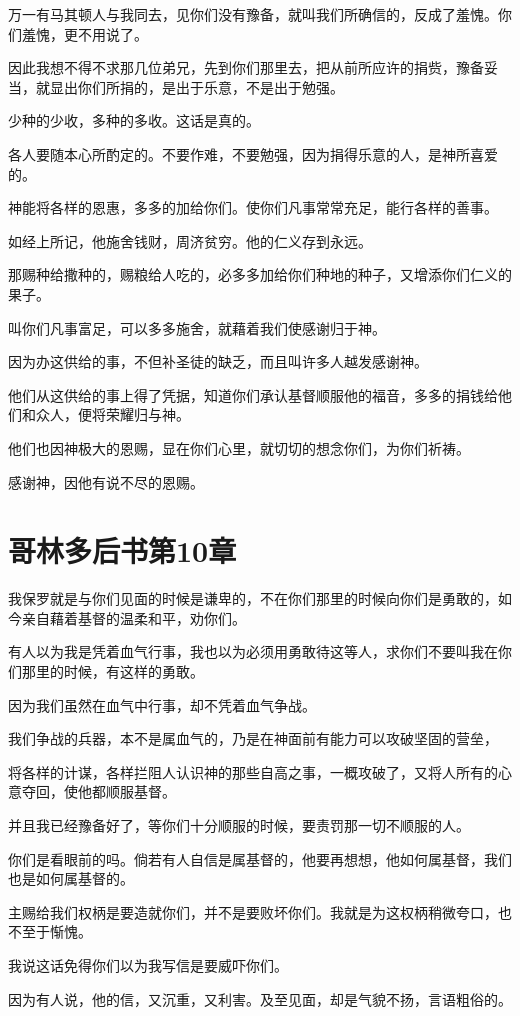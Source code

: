 \documentclass[12pt,oneside]{book}
\begin{document}
万一有马其顿人与我同去，见你们没有豫备，就叫我们所确信的，反成了羞愧。你们羞愧，更不用说了。

因此我想不得不求那几位弟兄，先到你们那里去，把从前所应许的捐赀，豫备妥当，就显出你们所捐的，是出于乐意，不是出于勉强。

少种的少收，多种的多收。这话是真的。

各人要随本心所酌定的。不要作难，不要勉强，因为捐得乐意的人，是神所喜爱的。

神能将各样的恩惠，多多的加给你们。使你们凡事常常充足，能行各样的善事。

如经上所记，他施舍钱财，周济贫穷。他的仁义存到永远。

那赐种给撒种的，赐粮给人吃的，必多多加给你们种地的种子，又增添你们仁义的果子。

叫你们凡事富足，可以多多施舍，就藉着我们使感谢归于神。

因为办这供给的事，不但补圣徒的缺乏，而且叫许多人越发感谢神。

他们从这供给的事上得了凭据，知道你们承认基督顺服他的福音，多多的捐钱给他们和众人，便将荣耀归与神。

他们也因神极大的恩赐，显在你们心里，就切切的想念你们，为你们祈祷。

感谢神，因他有说不尽的恩赐。

\chapter{哥林多后书第10章}
我保罗就是与你们见面的时候是谦卑的，不在你们那里的时候向你们是勇敢的，如今亲自藉着基督的温柔和平，劝你们。

有人以为我是凭着血气行事，我也以为必须用勇敢待这等人，求你们不要叫我在你们那里的时候，有这样的勇敢。

因为我们虽然在血气中行事，却不凭着血气争战。

我们争战的兵器，本不是属血气的，乃是在神面前有能力可以攻破坚固的营垒，

将各样的计谋，各样拦阻人认识神的那些自高之事，一概攻破了，又将人所有的心意夺回，使他都顺服基督。

并且我已经豫备好了，等你们十分顺服的时候，要责罚那一切不顺服的人。

你们是看眼前的吗。倘若有人自信是属基督的，他要再想想，他如何属基督，我们也是如何属基督的。

主赐给我们权柄是要造就你们，并不是要败坏你们。我就是为这权柄稍微夸口，也不至于惭愧。

我说这话免得你们以为我写信是要威吓你们。

因为有人说，他的信，又沉重，又利害。及至见面，却是气貌不扬，言语粗俗的。
\end{document}

